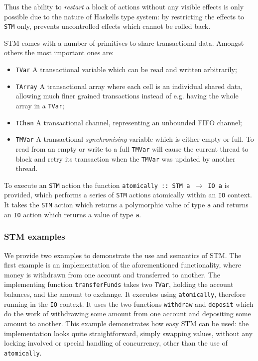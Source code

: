 Thus the ability to \textit{restart} a block of actions without any visible effects is only possible due to the nature of Haskells type system: by restricting the effects to \texttt{STM} only, prevents uncontrolled effects which cannot be rolled back.

STM comes with a number of primitives to share transactional data. Amongst others the most important ones are:

\begin{itemize}
	\item \texttt{TVar}   A transactional variable which can be read and written arbitrarily;
	\item \texttt{TArray}   A transactional array where each cell is an individual shared data, allowing much finer grained transactions instead of e.g. having the whole array in a \texttt{TVar};
	\item \texttt{TChan}   A transactional channel, representing an unbounded FIFO channel;
	\item \texttt{TMVar}   A transactional \textit{synchronising} variable which is either empty or full. To read from an empty or write to a full \texttt{TMVar} will cause the current thread to block and retry its transaction when the \texttt{TMVar} was updated by another thread.
\end{itemize}

To execute an \texttt{STM} action the function \texttt{atomically :: STM a $\to$ IO a} is provided, which performs a series of \texttt{STM} actions atomically within an \texttt{IO} context. It takes the \texttt{STM} action which returns a polymorphic value of type \texttt{a} and returns an \texttt{IO} action which returns a value of type \texttt{a}.

\subsubsection{STM examples}
\label{sub:stm_example}
We provide two examples to demonstrate the use and semantics of STM. The first example is an implementation of the aforementioned functionality, where money is withdrawn from one account and transferred to another. The implementing function \texttt{transferFunds} takes two \texttt{TVar}, holding the account balances, and the amount to exchange. It executes using \texttt{atomically}, therefore running in the \texttt{IO} context. It uses the two functions \texttt{withdraw} and \texttt{deposit} which do the work of withdrawing some amount from one account and depositing some amount to another. This example demonstrates how easy STM can be used: the implementation looks quite straightforward, simply swapping values, without any locking involved or special handling of concurrency, other than the use of \texttt{atomically}. \\ %

